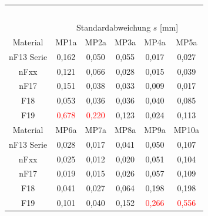 \documentclass[12pt,a4paper,parskip,twoside,BCOR5mm,headsepline]{scrartcl}
\begin{document}
\begin{table}[hbtp]
\begin{tabular}{cccccc}
     &&&&&\\
     &&&&&\\
     &&&&&\\
     &&&&&\\
     &&&&&\\
     
     \toprule
      & \multicolumn{5}{c}{Standardabweichung $s$ [mm]}\\
   \cmidrule(ll){2-6}
   Material    & MP1a & MP2a & MP3a & MP4a & MP5a \\ 
   \midrule
    nF13 Serie&0,162&0,050&0,055&0,017&0,027\\
    nFxx &0,121&0,066&0,028&0,015&0,039\\
    nF17 &0,151&0,038&0,033&0,009&0,017\\
    F18 &0,053&0,036&0,036&0,040&0,085\\
    F19 &\textcolor{red}{0,678}&\textcolor{red}{0,220}&0,123&0,024&0,113\\
     \midrule
     
  Material    & MP6a & MP7a & MP8a & MP9a & MP10a  \\
  \midrule
    nF13 Serie &0,028&0,017&0,041&0,050&0,107\\
 nFxx   &0,025&0,012&0,020&0,051&0,104\\
nF17  &0,019&0,015&0,026&0,057&0,109\\ 
F18 &0,041&0,027&0,064&0,198&0,198\\
F19 &0,101&0,040&0,152&\textcolor{red}{0,266}&\textcolor{red}{0,556}\\
   \bottomrule 
         
   \end{tabular} 
\end{table}
\newpage
\end{document}
